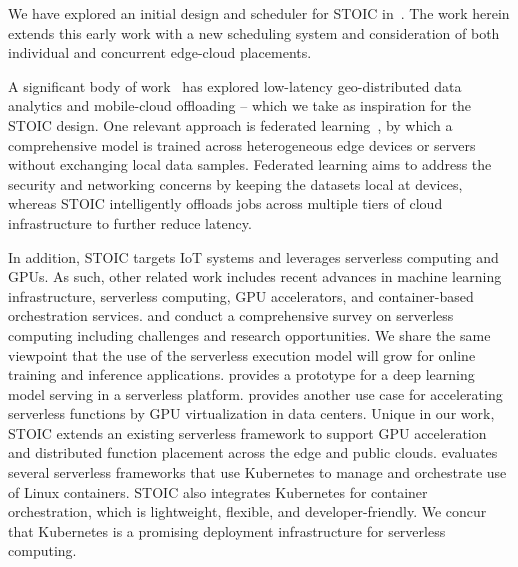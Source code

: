We have explored an initial design and scheduler for STOIC
in~\cite{ref:stoic2020}.  The work herein extends this early work with a new
scheduling system and consideration of both individual and concurrent edge-cloud
placements. 

A significant body of work~\cite{ref:lowlatency, ref:bandwidth, ref:MAUI} has
explored low-latency geo-distributed data analytics and mobile-cloud offloading
-- which we take as inspiration for the STOIC design. One relevant approach is
federated learning~\cite{ref:federated}, by which a comprehensive model is
trained across heterogeneous edge devices or servers without exchanging local
data samples. Federated learning aims to address the security and networking
concerns by keeping the datasets local at devices, whereas STOIC intelligently
offloads jobs across multiple tiers of cloud infrastructure to further reduce
latency. 

In addition, STOIC targets IoT systems and leverages serverless
computing and GPUs. 
As such, other related work includes recent advances in machine learning
infrastructure, serverless computing, GPU accelerators, and container-based
orchestration services. \cite{ref:serverlessstep} and
\cite{ref:berkeleyserverless} conduct a comprehensive survey on serverless
computing including challenges and research opportunities. We share the same
viewpoint that the use of the serverless execution model will grow for online
training and inference applications. \cite{ref:deepserving} provides a prototype
for a deep learning model serving in a serverless platform.
\cite{ref:accelerated} provides another use case for accelerating serverless
functions by GPU virtualization in data centers. Unique in our work, STOIC
extends an existing serverless framework to support GPU acceleration and
distributed function placement across the edge and public clouds.
\cite{ref:evaluation} evaluates several serverless frameworks that use
Kubernetes to manage and orchestrate use of Linux containers. STOIC also
integrates Kubernetes for container orchestration, which is lightweight,
flexible, and developer-friendly.  We concur that Kubernetes is a promising
deployment infrastructure for serverless computing.  

